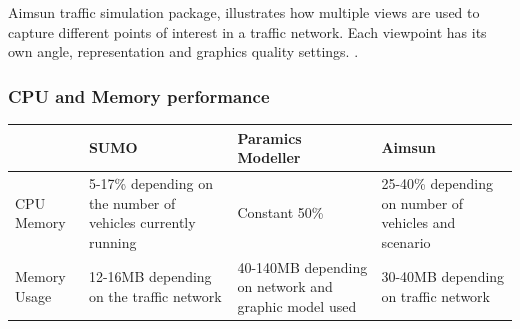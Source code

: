 	Aimsun traffic simulation package, illustrates how multiple views are used to capture different points of interest in a traffic network. Each viewpoint has its own angle, representation and graphics quality settings. \cite{EM2}.
	
\subsubsection{CPU and Memory performance}
	
		\begin{center}
		\begin{tabular}{| l | p{2.5cm} | p{2.5cm} | p{2.5cm} |}
			\hline
					& SUMO	& Paramics Modeller & Aimsun	\\ \hline
			CPU Memory	&	5-17\% depending on the number of vehicles currently running	& Constant 50\%	& 25-40\% depending on number of vehicles and scenario	\\ \hline
			Memory Usage &	12-16MB depending on the traffic network	& 40-140MB depending on network and graphic model used	& 30-40MB depending on traffic network	\\
			\hline
		\end{tabular}
		\end{center}